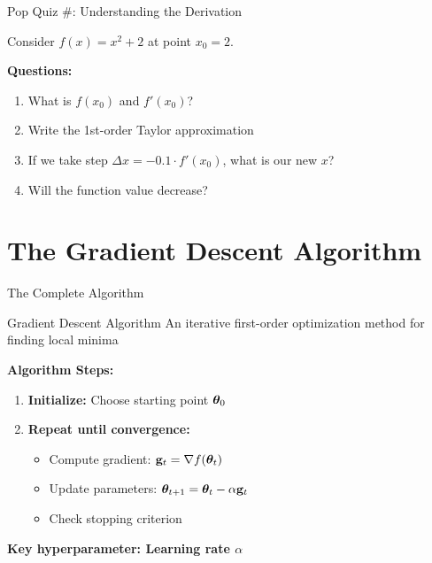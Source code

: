 \documentclass[usenames,dvipsnames]{beamer}
\begin{document}
  \begin{frame}{Pop Quiz \#\thepopquiz: Understanding the Derivation}
    \begin{popquizbox}{\thepopquiz}
    Consider $f(x) = x^2 + 2$ at point $x_0 = 2$.
    
    \textbf{Questions:}
    \begin{enumerate}
        \item What is $f(x_0)$ and $f'(x_0)$?
        \item Write the 1st-order Taylor approximation
        \item If we take step $\Delta x = -0.1 \cdot f'(x_0)$, what is our new $x$?
        \item Will the function value decrease?
    \end{enumerate}
    \end{popquizbox}
  \end{frame}

  \section{The Gradient Descent Algorithm}

  \begin{frame}{The Complete Algorithm}
    \begin{definitionbox}{Gradient Descent Algorithm}
    An iterative first-order optimization method for finding local minima
    \end{definitionbox}
    
    \pause
    \textbf{Algorithm Steps:}
    \begin{enumerate}[<+->]
        \item \textbf{Initialize:} Choose starting point $\boldsymbol{\theta}_0$
        \item \textbf{Repeat until convergence:}
        \begin{itemize}
            \item Compute gradient: $\mathbf{g}_t = \nabla f(\boldsymbol{\theta}_t)$
            \item Update parameters: $\boldsymbol{\theta}_{t+1} = \boldsymbol{\theta}_t - \alpha \mathbf{g}_t$  
            \item Check stopping criterion
        \end{itemize}
    \end{enumerate}
    
    \pause
    \textbf{Key hyperparameter: Learning rate $\alpha$}
  \end{frame}
\end{document}
